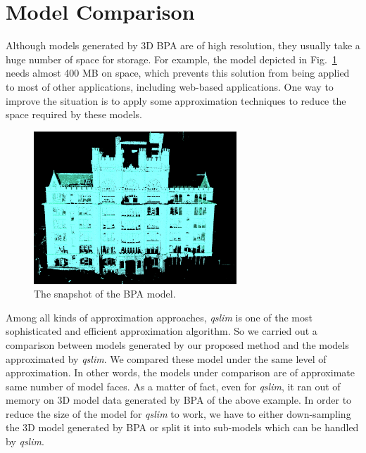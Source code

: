 \documentclass{acmsiggraph}                     %
\newcommand{\Fig}[1]{Fig.~\ref{fig:#1}}
\begin{document}
\section{Model Comparison}
Although models generated by 3D BPA are of high resolution, they usually take a huge number of space
for storage. For example, the model depicted in \Fig{TH_BPA} needs almost 400 MB on space, which
prevents this solution from being applied to most of other applications, including web-based applications.
One way to improve the situation is to apply some approximation techniques to reduce the space required
by these models.
\begin{figure}[htbp]
\begin{center}
\includegraphics[width=3in]{BPA_TH.png}
\end{center}
\caption{The snapshot of the BPA model.}
\label{fig:TH_BPA}
\end{figure}

Among all kinds of approximation approaches, {\it qslim} is one of the most sophisticated and efficient
approximation algorithm. So we carried out a comparison between models generated by our proposed
method and the models approximated by {\it qslim}. We compared these model under the same level of
approximation. In other words, the models under comparison are of approximate same number of model faces.
As a matter of fact, even for {\it qslim}, it ran out of memory on 3D model data generated by BPA of
the above example.
In order to reduce the size of the model for {\it qslim} to work, we have to either down-sampling the 3D model
generated by BPA or split it into sub-models which can be handled by {\it qslim}.
\end{document}
